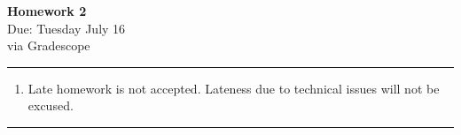 \documentclass[12pt]{article}
\newif\ifshow
\begin{document}
    \begin{center}
    \ifshow
      \textbf{\Large Homework 2 Solution}\\
    \else
      \textbf{\Large Homework 2}\\
    \fi
    Due: Tuesday July 16\\via Gradescope\\
    \end{center}
    
    \hrule
    
    \vspace{0.2cm}
    
    \begin{enumerate}[$\bullet$]  
    \item Late homework is not accepted.  Lateness due to technical issues will not be excused.  
    \end{enumerate}
    
    \hrule
    
    \vspace{0.5cm}
    
    
    
\end{document}
